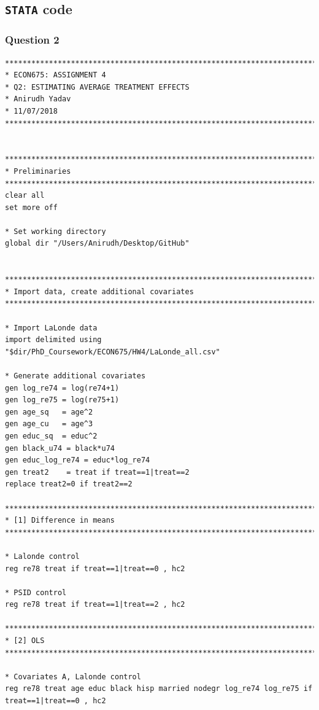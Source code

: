 \documentclass[12pt]{article}
\begin{document}
\subsection{\texttt{STATA} code}

\subsubsection{Question 2}
\begin{verbatim}
********************************************************************************
* ECON675: ASSIGNMENT 4
* Q2: ESTIMATING AVERAGE TREATMENT EFFECTS
* Anirudh Yadav
* 11/07/2018
********************************************************************************


********************************************************************************
* Preliminaries
********************************************************************************
clear all
set more off

* Set working directory 
global dir "/Users/Anirudh/Desktop/GitHub"


********************************************************************************
* Import data, create additional covariates
********************************************************************************

* Import LaLonde data
import delimited using "$dir/PhD_Coursework/ECON675/HW4/LaLonde_all.csv"

* Generate additional covariates 
gen log_re74 = log(re74+1)
gen log_re75 = log(re75+1)
gen age_sq   = age^2
gen age_cu   = age^3
gen educ_sq  = educ^2
gen black_u74 = black*u74
gen educ_log_re74 = educ*log_re74
gen treat2    = treat if treat==1|treat==2
replace treat2=0 if treat2==2

********************************************************************************
* [1] Difference in means
********************************************************************************

* Lalonde control
reg re78 treat if treat==1|treat==0 , hc2

* PSID control
reg re78 treat if treat==1|treat==2 , hc2

********************************************************************************
* [2] OLS
********************************************************************************

* Covariates A, Lalonde control
reg re78 treat age educ black hisp married nodegr log_re74 log_re75 if treat==1|treat==0 , hc2


\end{verbatim}
\end{document}
